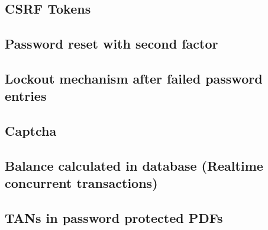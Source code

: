 \subsection{CSRF Tokens}

\subsection{Password reset with second factor}

\subsection{Lockout mechanism after failed password entries}

\subsection{Captcha}

\subsection{Balance calculated in database (Realtime concurrent transactions)}

\subsection{TANs in password protected PDFs}
